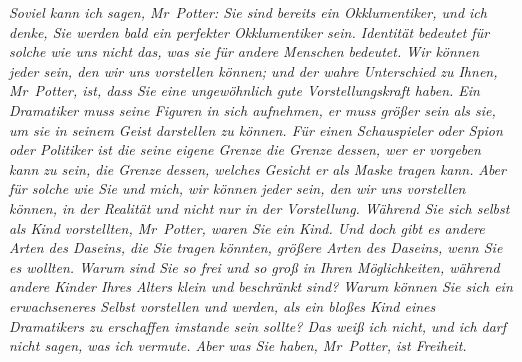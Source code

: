 \emph{Soviel kann ich sagen, Mr~Potter: Sie sind bereits ein Okklumentiker, und ich denke, Sie werden bald ein perfekter Okklumentiker sein. Identität bedeutet für solche wie uns nicht das, was sie für andere Menschen bedeutet. Wir können jeder sein, den wir uns vorstellen können; und der wahre Unterschied zu Ihnen, Mr~Potter, ist, dass Sie eine ungewöhnlich gute Vorstellungskraft haben. Ein Dramatiker muss seine Figuren in sich aufnehmen, er muss größer sein als sie, um sie in seinem Geist darstellen zu können. Für einen Schauspieler oder Spion oder Politiker ist die seine eigene Grenze die Grenze dessen, wer er vorgeben kann zu sein, die Grenze dessen, welches Gesicht er als Maske tragen kann.}
\emph{Aber für solche wie Sie und mich, wir können jeder \emph{sein}, den wir uns vorstellen können, in der Realität und nicht nur in der Vorstellung. Während Sie sich selbst als Kind vorstellten, Mr~Potter, \emph{waren} Sie ein Kind. Und doch gibt es andere Arten des Daseins, die Sie tragen könnten, größere Arten des Daseins, wenn Sie es wollten. Warum sind Sie so frei und so groß in Ihren Möglichkeiten, während andere Kinder Ihres Alters klein und beschränkt sind? Warum können Sie sich ein erwachseneres Selbst vorstellen und \emph{werden}, als ein bloßes Kind eines Dramatikers zu erschaffen imstande sein sollte? Das weiß ich nicht, und ich darf nicht sagen, was ich vermute. Aber was Sie haben, Mr~Potter, ist Freiheit.}


